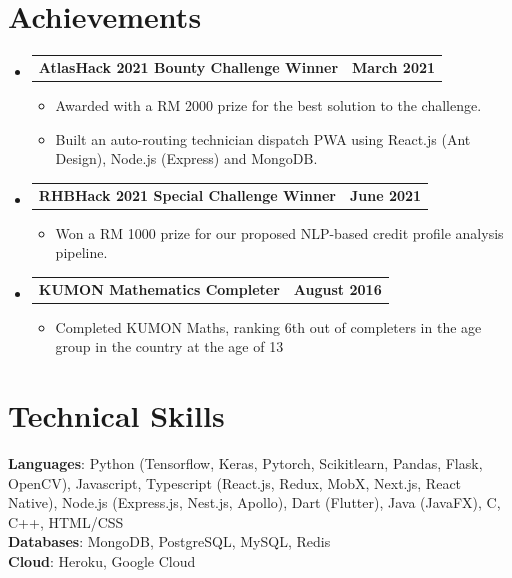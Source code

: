 \documentclass[letterpaper,12pt]{article}
\makeatletter
\newcommand{\resumeItem}[1]{
  \item\small{
    {#1 \vspace{-2pt}}
  }
}
\newcommand{\resumeProjectHeading}[2]{
    \item
    \begin{tabular*}{1.001\textwidth}{l@{\extracolsep{\fill}}r}
      \small#1 & \textbf{\small #2}\\
    \end{tabular*}\vspace{-7pt}
}
\newcommand{\resumeSubHeadingListStart}{\begin{itemize}[leftmargin=0.0in, label={}]}
\newcommand{\resumeSubHeadingListEnd}{\end{itemize}}
\newcommand{\resumeItemListStart}{\begin{itemize}}
\newcommand{\resumeItemListEnd}{\end{itemize}\vspace{-5pt}}
\makeatother
\begin{document}
\section{Achievements}
    \vspace{-5pt}
    \resumeSubHeadingListStart
      \resumeProjectHeading
          {\textbf{AtlasHack 2021 Bounty Challenge Winner}}{March 2021}
          \resumeItemListStart
            \resumeItem{Awarded with a RM 2000 prize for the best solution to the challenge.}
            \resumeItem{Built an auto-routing technician dispatch PWA using React.js (Ant Design), Node.js (Express) and MongoDB.}
          \resumeItemListEnd
          \vspace{-20pt}
      \resumeProjectHeading
          {\textbf{RHBHack 2021 Special Challenge Winner}}{June 2021}
          \resumeItemListStart
            \resumeItem{Won a RM 1000 prize for our proposed NLP-based credit profile analysis pipeline.}
          \resumeItemListEnd
          \vspace{-20pt}
      \resumeProjectHeading
          {\textbf{KUMON Mathematics Completer}}{August 2016}
          \resumeItemListStart
            \resumeItem{Completed KUMON Maths, ranking 6th out of completers in the age group in the country at the
            age of 13}
          \resumeItemListEnd
          \vspace{-2pt}
    \resumeSubHeadingListEnd
\vspace{-15pt}

%
\section{Technical Skills}
 \begin{itemize}[leftmargin=0.15in, label={}]
    \small{\item{
     \textbf{Languages}{: Python (Tensorflow, Keras, Pytorch, Scikitlearn, Pandas, Flask, OpenCV), Javascript, Typescript (React.js, Redux, MobX, Next.js, React Native), Node.js (Express.js, Nest.js, Apollo), Dart (Flutter), Java (JavaFX), C, C++, HTML/CSS} \\
     \textbf{Databases}{: MongoDB, PostgreSQL, MySQL, Redis} \\
     \textbf{Cloud}{: Heroku, Google Cloud} \\
    }}
 \end{itemize}
 \vspace{-16pt}


\end{document}
